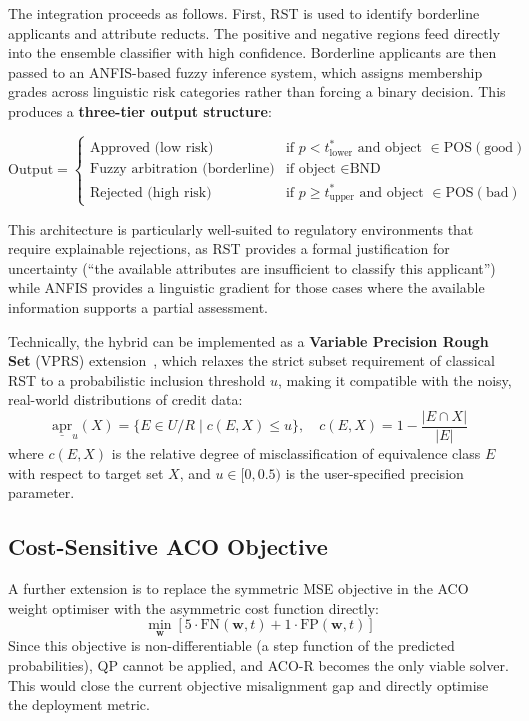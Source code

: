 \documentclass[12pt,a4paper]{article}
\begin{document}
The integration proceeds as follows. First, RST is used to identify borderline applicants and attribute reducts. The positive and negative regions feed directly into the ensemble classifier with high confidence. Borderline applicants are then passed to an ANFIS-based fuzzy inference system, which assigns membership grades across linguistic risk categories rather than forcing a binary decision. This produces a \textbf{three-tier output structure}:

\[
\text{Output} = \begin{cases}
\text{Approved (low risk)} & \text{if } p < t^*_\text{lower} \text{ and object } \in \text{POS}(\text{good}) \\
\text{Fuzzy arbitration (borderline)} & \text{if object } \in \text{BND} \\
\text{Rejected (high risk)} & \text{if } p \geq t^*_\text{upper} \text{ and object } \in \text{POS}(\text{bad})
\end{cases}
\]

This architecture is particularly well-suited to regulatory environments that require explainable rejections, as RST provides a formal justification for uncertainty (``the available attributes are insufficient to classify this applicant'') while ANFIS provides a linguistic gradient for those cases where the available information supports a partial assessment.

Technically, the hybrid can be implemented as a \textbf{Variable Precision Rough Set} (VPRS) extension~\citep{ziarko1993variable}, which relaxes the strict subset requirement of classical RST to a probabilistic inclusion threshold $u$, making it compatible with the noisy, real-world distributions of credit data:
\[
\underline{\text{apr}}_u(X) = \{E \in U/R \mid c(E, X) \leq u\}, \quad c(E, X) = 1 - \frac{|E \cap X|}{|E|}
\]
where $c(E, X)$ is the relative degree of misclassification of equivalence class $E$ with respect to target set $X$, and $u \in [0, 0.5)$ is the user-specified precision parameter.

\subsection{Cost-Sensitive ACO Objective}

A further extension is to replace the symmetric MSE objective in the ACO weight optimiser with the asymmetric cost function directly:
\[
\min_{\mathbf{w}} \left[ 5 \cdot \text{FN}(\mathbf{w}, t) + 1 \cdot \text{FP}(\mathbf{w}, t) \right]
\]
Since this objective is non-differentiable (a step function of the predicted probabilities), QP cannot be applied, and ACO-R becomes the only viable solver. This would close the current objective misalignment gap and directly optimise the deployment metric.
\end{document}
